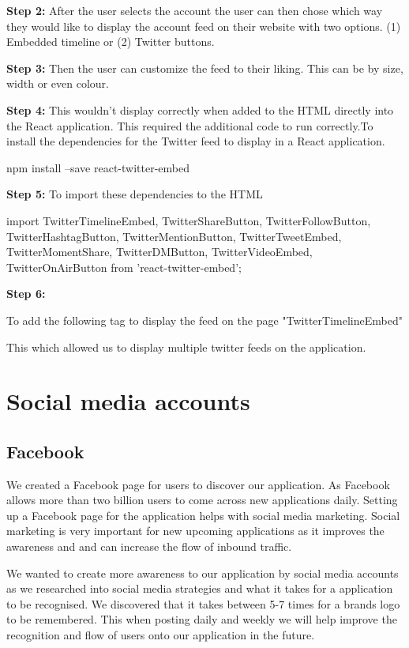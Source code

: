 \textbf{Step 2:} \hfill \break
After the user selects the account the user can then chose which way they would like to display the account feed on their website with two options. (1) Embedded timeline or (2) Twitter buttons.\hfill \break

\textbf{Step 3:} \hfill \break
Then the user can customize the feed to their liking. This can be by size, width or even colour.\hfill \break

\textbf{Step 4:} \hfill \break
This wouldn't display correctly when added to the HTML directly into the React application. This required the additional code to run correctly.To install the dependencies for the Twitter feed to display in a React application.\hfill \break


npm install --save react-twitter-embed \hfill \break

\textbf{Step 5:} \hfill \break
To import these dependencies to the HTML \hfill \break

import { TwitterTimelineEmbed, TwitterShareButton, TwitterFollowButton, TwitterHashtagButton, TwitterMentionButton, TwitterTweetEmbed, TwitterMomentShare, TwitterDMButton, TwitterVideoEmbed, TwitterOnAirButton } from 'react-twitter-embed';\hfill \break

\hfill \break
\textbf{Step 6:} \hfill \break

To add the following tag to display the feed on the page \hfill \break
"TwitterTimelineEmbed" \hfill \break

This which allowed us to display multiple twitter feeds on the application.




\section{Social media accounts}
\subsection{Facebook}


We created a Facebook\cite{ref10} page for users to discover our application. As Facebook allows more than two billion users to come across new applications daily. Setting up a Facebook page for the application helps with social media marketing. Social marketing is very important for new upcoming applications as it improves the awareness and and can increase the flow of inbound traffic.\hfill \break

We wanted to create more awareness to our application by social media accounts as we researched into social media strategies and what it takes for a application to be recognised. We discovered that it takes between 5-7 times for a brands logo to be remembered. This when posting daily and weekly we will help improve the recognition and flow of users onto our application in the future.\hfill \break

